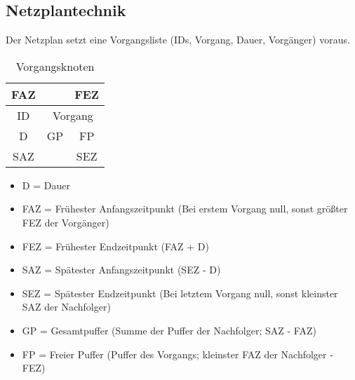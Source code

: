 \subsection{Netzplantechnik}

Der Netzplan setzt eine Vorgangsliste (IDs, Vorgang, Dauer, Vorgänger) voraus.

\begin{table}
    [H]
    \centering
    \begin{tabular}{|c|c|c|}
        \multicolumn{1}{c}{FAZ} & \multicolumn{1}{c}{}         & \multicolumn{1}{c}{FEZ} \\\hline
        ID                      & \multicolumn{2}{c|}{Vorgang}                           \\\hline
        D                       & GP                           & FP                      \\\hline
        \multicolumn{1}{c}{SAZ} & \multicolumn{1}{c}{}         & \multicolumn{1}{c}{SEZ} \\
    \end{tabular}
    \caption{Vorgangsknoten}
\end{table}

\begin{itemize}
    \item D = Dauer
    \item FAZ = Frühester Anfangszeitpunkt (Bei erstem Vorgang null, sonst größter FEZ der Vorgänger)
    \item FEZ = Frühester Endzeitpunkt (FAZ + D)
    \item SAZ = Spätester Anfangszeitpunkt (SEZ - D)
    \item SEZ = Spätester Endzeitpunkt (Bei letztem Vorgang null, sonst kleinster SAZ der Nachfolger)
    \item GP = Gesamtpuffer (Summe der Puffer der Nachfolger; SAZ - FAZ)
    \item FP = Freier Puffer (Puffer des Vorgangs; kleinster FAZ der Nachfolger - FEZ)
\end{itemize}